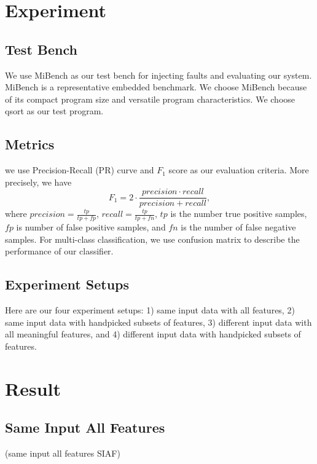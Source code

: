 \section{Experiment}
\subsection{Test Bench}
We use MiBench \cite{guthaus2001mibench} as our test bench for injecting faults and evaluating our system. MiBench is a representative embedded benchmark. We choose MiBench because of its compact program size and versatile program characteristics. We choose qsort as our test program.

\subsection{Metrics}
we use Precision-Recall (PR) curve and $F_1$ score as our evaluation criteria. More precisely, we have
\begin{equation}
F_{1} = 2\cdot\frac{precision \cdot recall}{precision + recall},
\end{equation}
where $precision = \frac{tp}{tp+fp}$, $recall = \frac{tp}{tp+fn}$, $tp$ is the number true positive samples, $fp$ is number of false positive samples, and $fn$ is the number of false negative samples. For multi-class classification, we use confusion matrix to describe the performance of our classifier.

\subsection{Experiment Setups}
Here are our four experiment setups: 1) same input data with all features, 2) same input data with handpicked subsets of features, 3) different input data with all meaningful features, and 4) different input data with handpicked subsets of features.

\section{Result}
\subsection{Same Input All Features}
(same input all features SIAF)

